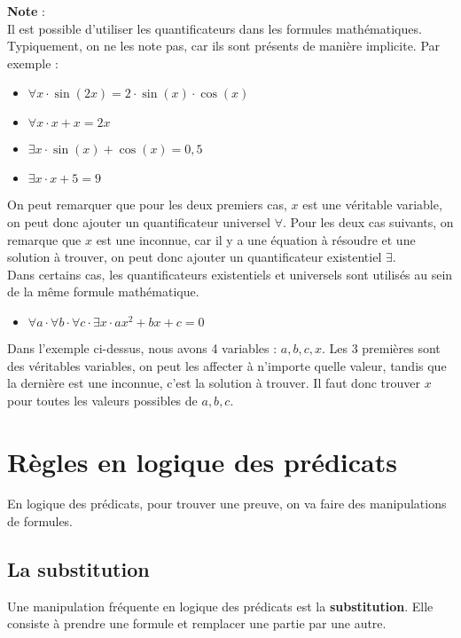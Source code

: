 \begin{framed}
\textbf{Note} :\\

Il est possible d'utiliser les quantificateurs  dans les formules mathématiques. Typiquement, on ne les note pas, car ils sont présents de manière implicite. Par exemple :
\begin{itemize}
\item $\forall x \cdot \sin(2x) = 2 \cdot \sin(x) \cdot \cos(x)$ 
\item $\forall x \cdot x + x = 2x$
\item $\exists x \cdot \sin(x) + \cos(x) = 0,5$
\item $\exists x \cdot x + 5 = 9$
\end{itemize} 

On peut remarquer que pour les deux premiers cas, $x$ est une véritable variable, on peut donc ajouter un quantificateur universel $\forall$. 
Pour les deux cas suivants, on remarque que $x$ est une inconnue, car il y a une équation à résoudre et une solution à trouver, on peut donc ajouter un quantificateur existentiel $\exists$.\\

Dans certains cas, les quantificateurs existentiels et universels sont utilisés au sein de la même formule mathématique.
\begin{itemize}
\item[] $\forall a \cdot \forall b \cdot \forall c \cdot \exists x \cdot ax^{2}+bx+c = 0$
\end{itemize}
Dans l'exemple ci-dessus, nous avons 4 variables : $a,b,c,x$. Les 3 premières sont des véritables variables, on peut les affecter à n'importe quelle valeur, tandis que la dernière est une inconnue, c'est la solution à trouver. Il faut donc trouver $x$ pour toutes les valeurs possibles de $a,b,c$.
\end{framed}

\section{Règles en logique des prédicats}
En logique des prédicats, pour trouver une preuve, on va faire des manipulations de formules.

\subsection{La substitution}
Une manipulation fréquente en logique des prédicats est la \textbf{substitution}. Elle consiste à prendre une formule et remplacer une partie par une autre.\\

